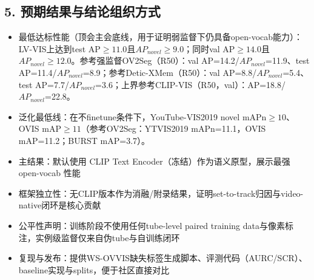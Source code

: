 \documentclass[UTF8]{ctexart}
\begin{document}
\subsection*{5. 预期结果与结论组织方式}
\begin{itemize}
\item 最低达标性能（顶会主会底线，用于证明弱监督下仍具备open-vocab能力）：LV-VIS上达到test AP$\ge 11.0$且$AP_{novel}\ge 9.0$；同时val AP$\ge 14.0$且$AP_{novel}\ge 12.0$。参考强监督OV2Seg（R50）：val AP=14.2/$AP_{novel}$=11.9、test AP=11.4/$AP_{novel}$=8.9；参考Detic-XMem（R50）：val AP=8.8/$AP_{novel}$=5.4、test AP=7.7/$AP_{novel}$=3.6；上界参考CLIP-VIS（R50，val）：AP=18.8/$AP_{novel}$=22.8。
\item 泛化最低线：在不finetune条件下，YouTube-VIS2019 novel mAPn$\ge 10$、OVIS mAP$\ge 11$（参考OV2Seg：YTVIS2019 mAPn=11.1，OVIS mAP=11.2；BURST mAP=3.7）。
\item 主结果：默认使用 CLIP Text Encoder（冻结）作为语义原型，展示最强 open-vocab 性能
\item 框架独立性：无CLIP版本作为消融/附录结果，证明set-to-track归因与video-native闭环是核心贡献
\item 公平性声明：训练阶段不使用任何tube-level paired training data与像素标注，实例级监督仅来自伪tube与自训练闭环
\item 复现与发布：提供WS-OVVIS缺失标签生成脚本、评测代码（AURC/SCR）、baseline实现与splits，便于社区直接对比
\end{itemize}
\end{document}
